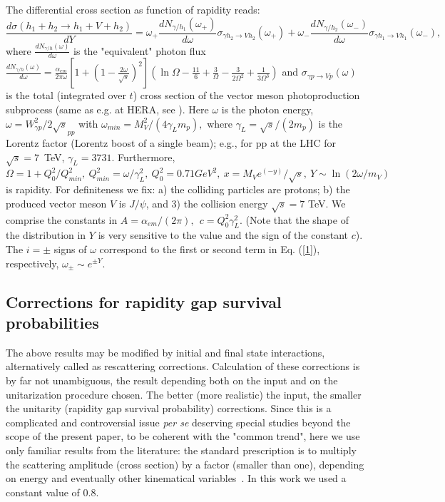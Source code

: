 \documentclass[12pt]{article}
\begin{document}
The differential cross section as function of rapidity reads:
 \begin{equation}\label{1}
\frac{d\sigma (h_1+h_2\rightarrow h_1+V+h_2)}{dY}=\omega_+\frac{dN_{\gamma/h_1}(\omega_+)}{d\omega}\sigma_{\gamma h_2\rightarrow Vh_2}(\omega_+)+
\omega_-\frac{dN_{\gamma/h_2}(\omega_-)}{d\omega}\sigma_{\gamma h_1\rightarrow Vh_1}(\omega_-),
\end{equation}
where $\frac{dN_{\gamma/h}(\omega)}{d\omega}$ is the "equivalent" photon flux \cite{Review}
$\frac{dN_{\gamma/h}(\omega)}{d\omega}=\frac{\alpha_{em}}{2\pi\omega}[1+(1-\frac{2\omega}{\sqrt{s}})^2]
(\ln\Omega-\frac{11}{6}+\frac{3}{\Omega}-\frac{3}{2\Omega^2}+\frac{1}{3\Omega^3})$
and $\sigma_{\gamma p\rightarrow Vp}(\omega)$ is the total (integrated over $t$) cross section of the vector meson photoproduction subprocess (same as e.g. at HERA, see \cite{Capua}). Here $\omega$ is the photon energy, $\omega=W^2_{\gamma p}/2\sqrt s_{pp}$ with
$\omega_{min}=M_V^2/(4\gamma_Lm_p),$ where $\gamma_L=\sqrt s/(2m_p)$
is the Lorentz factor (Lorentz boost of a single beam); e.g., for pp at the LHC for $\sqrt{s}=7$~TeV,
$\gamma_L=3731$.
Furthermore,
$\Omega=1+Q_0^2/Q_{min}^2,\  Q_{min}^2=\omega/\gamma_L^2,\   Q_0^2=0.71GeV^2,\   x=M_Ve^{(-y)}/\sqrt s,\  Y\sim\ln(2\omega/m_V)$ is rapidity.
For definiteness we fix: a) the colliding particles are protons;
b) the produced vector meson $V$ is $J/\psi$, and 3) the collision energy $\sqrt s=7$ TeV.
We comprise the constants in $A=\alpha_{em}/(2\pi),\ \  c=Q_0^2\gamma_L^2$.
(Note that the shape of the distribution in $Y$ is very sensitive to the value and the sign of the constant $c$).
The $i=\pm$ signs of $\omega$ correspond to the first or second term in Eq. (\ref{1}), respectively, $\omega_{\pm}\sim e^{\pm Y}$.

\subsection{Corrections for rapidity gap survival probabilities}\label{corrections}
The above results may be modified by initial and final state interactions,
alternatively called as rescattering corrections. Calculation of these
corrections is by far not unambiguous, the result depending both on the input
and on the unitarization procedure chosen. The better (more realistic) the input, the smaller the unitarity (rapidity gap survival probability) corrections.
Since this is a complicated and controversial issue {\it per se} deserving special studies beyond the scope of the present paper, to be coherent with the "common trend", here we use only familiar results from the literature:
the standard prescription is to multiply the scattering amplitude (cross section) by a factor (smaller than one), depending on energy and eventually other kinematical variables~\cite{Ryskin}.
In this work we used a constant value of 0.8.
\end{document}
